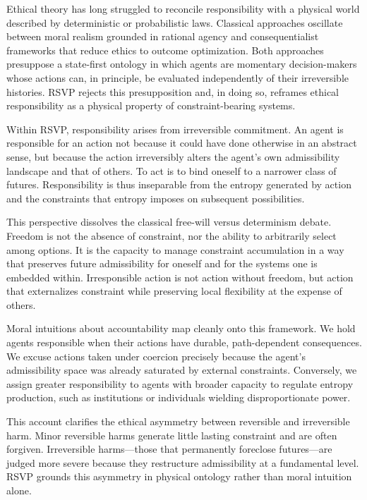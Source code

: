 \documentclass[11pt,oneside]{book}
\begin{document}
Ethical theory has long struggled to reconcile responsibility with a physical world described by deterministic or probabilistic laws. Classical approaches oscillate between moral realism grounded in rational agency and consequentialist frameworks that reduce ethics to outcome optimization. Both approaches presuppose a state-first ontology in which agents are momentary decision-makers whose actions can, in principle, be evaluated independently of their irreversible histories. RSVP rejects this presupposition and, in doing so, reframes ethical responsibility as a physical property of constraint-bearing systems.

Within RSVP, responsibility arises from irreversible commitment. An agent is responsible for an action not because it could have done otherwise in an abstract sense, but because the action irreversibly alters the agent’s own admissibility landscape and that of others. To act is to bind oneself to a narrower class of futures. Responsibility is thus inseparable from the entropy generated by action and the constraints that entropy imposes on subsequent possibilities.

This perspective dissolves the classical free-will versus determinism debate. Freedom is not the absence of constraint, nor the ability to arbitrarily select among options. It is the capacity to manage constraint accumulation in a way that preserves future admissibility for oneself and for the systems one is embedded within. Irresponsible action is not action without freedom, but action that externalizes constraint while preserving local flexibility at the expense of others.

Moral intuitions about accountability map cleanly onto this framework. We hold agents responsible when their actions have durable, path-dependent consequences. We excuse actions taken under coercion precisely because the agent’s admissibility space was already saturated by external constraints. Conversely, we assign greater responsibility to agents with broader capacity to regulate entropy production, such as institutions or individuals wielding disproportionate power.

This account clarifies the ethical asymmetry between reversible and irreversible harm. Minor reversible harms generate little lasting constraint and are often forgiven. Irreversible harms—those that permanently foreclose futures—are judged more severe because they restructure admissibility at a fundamental level. RSVP grounds this asymmetry in physical ontology rather than moral intuition alone.
\end{document}
